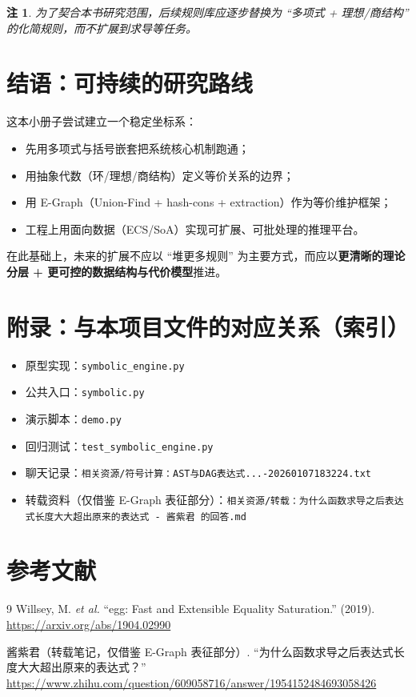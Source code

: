 \documentclass[12pt,openany]{book}
\newtheorem{remark}{注}[chapter]
\begin{document}
\begin{remark}
为了契合本书研究范围，后续规则库应逐步替换为 ``多项式 + 理想/商结构'' 的化简规则，而不扩展到求导等任务。
\end{remark}

\chapter{结语：可持续的研究路线}

这本小册子尝试建立一个稳定坐标系：

\begin{itemize}
  \item 先用多项式与括号嵌套把系统核心机制跑通；
  \item 用抽象代数（环/理想/商结构）定义等价关系的边界；
  \item 用 E-Graph（Union-Find + hash-cons + extraction）作为等价维护框架；
  \item 工程上用面向数据（ECS/SoA）实现可扩展、可批处理的推理平台。
\end{itemize}

在此基础上，未来的扩展不应以 ``堆更多规则'' 为主要方式，而应以\textbf{更清晰的理论分层 + 更可控的数据结构与代价模型}推进。

\appendix
\chapter{附录：与本项目文件的对应关系（索引）}

\begin{itemize}
  \item 原型实现：\texttt{symbolic\_engine.py}
  \item 公共入口：\texttt{symbolic.py}
  \item 演示脚本：\texttt{demo.py}
  \item 回归测试：\texttt{test\_symbolic\_engine.py}
  \item 聊天记录：\texttt{相关资源/符号计算：AST与DAG表达式...-20260107183224.txt}
  \item 转载资料（仅借鉴 E-Graph 表征部分）：\texttt{相关资源/转载：为什么函数求导之后表达式长度大大超出原来的表达式 - 酱紫君 的回答.md}
\end{itemize}

\backmatter
\chapter*{参考文献}

\begin{thebibliography}{9}
Willsey, M. \textit{et al.} ``egg: Fast and Extensible Equality Saturation.'' (2019).\\
\url{https://arxiv.org/abs/1904.02990}

酱紫君（转载笔记，仅借鉴 E-Graph 表征部分）. ``为什么函数求导之后表达式长度大大超出原来的表达式？''\\
\url{https://www.zhihu.com/question/609058716/answer/1954152484693058426}
\end{thebibliography}
\end{document}

